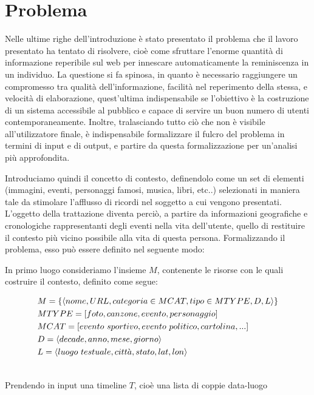 \documentclass[sigproc-sp.tex]{subfiles}
\begin{document}
\section{Problema}
Nelle ultime righe dell’introduzione è stato presentato il problema che il lavoro presentato ha tentato di risolvere, cioè come sfruttare l’enorme quantità di informazione reperibile sul web per innescare automaticamente la reminiscenza in un individuo. La questione si fa spinosa, in quanto è necessario raggiungere un compromesso tra qualità dell’informazione, facilità nel reperimento della stessa, e velocità di elaborazione, quest’ultima indispensabile se l’obiettivo è la costruzione di un sistema accessibile al pubblico e capace di servire un buon numero di utenti contemporaneamente. Inoltre, tralasciando tutto ciò che non è visibile all’utilizzatore finale, è indispensabile formalizzare il fulcro del problema in termini di input e di output, e partire da questa formalizzazione per un’analisi più approfondita.

Introduciamo quindi il concetto di contesto, definendolo come un set di elementi (immagini, eventi, personaggi famosi, musica, libri, etc..) selezionati in maniera tale da stimolare l’afflusso di ricordi nel soggetto a cui vengono presentati. L’oggetto della trattazione diventa perciò, a partire da informazioni geografiche e cronologiche rappresentanti degli eventi nella vita dell’utente, quello di restituire il contesto più vicino possibile alla vita di questa persona.
Formalizzando il problema, esso può essere definito nel seguente modo:
 
In primo luogo consideriamo l'insieme $M$, contenente le risorse con le quali costruire il contesto, definito come segue:

\begin{equation}
\begin{split}
&M = \{\langle nome, URL, categoria \in MCAT, tipo \in MTYPE , D, L\rangle\}\\
&MTYPE = [ foto,canzone,evento,personaggio ]\\
&MCAT = [evento \ sportivo,evento \ politico, cartolina, ...]\\
&D =  \langle decade, anno, mese, giorno\rangle\\
&L =  \langle luogo \ testuale, citt\grave{a}, stato, lat, lon\rangle\\
\notag
\end{split}
\end{equation}

Prendendo in input una timeline $T$, cioè una lista di coppie data-luogo
\end{document}
